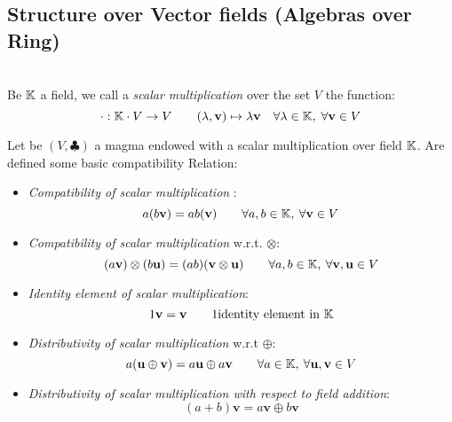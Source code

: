 \documentclass[a4paper,12pt]{scrartcl}    %
\newcommand{\OpA}{\otimes}
\newcommand{\OpB}{\oplus}
\begin{document}
\begin{landscape}
\newpage
	\begin{minipage}[c][\textheight]{0.30 \linewidth}
	    \section*{Structure over Vector fields (Algebras over Ring)}
	    \mbox{}\\
			Be $\mathbb{K}$ a field, we call a \emph{scalar multiplication} over the set $V$ the function:
				\begin{displaymath}
					\cdot : \mathbb{K} \cdot V \rightarrow  V \qquad (\lambda, \mathbf{v}) \mapsto \lambda \mathbf{v} \quad \forall \lambda \in \mathbb{K},\; 
					\forall \mathbf{v} \in V
				\end{displaymath}
			
			Let be $(V, \clubsuit)$ a magma endowed with a scalar multiplication over field $\mathbb{K}$.
			Are defined some basic compatibility  Relation:
			\begin{itemize}
			\item \emph{Compatibility of scalar multiplication} :
				\begin{equation}\label{scalarmulti}
					a ( b \mathbf{v} ) = ab (\mathbf{v}) \qquad \forall a,b \in \mathbb{K},\: \forall \mathbf{v} \in V
				\end{equation}
			\item \emph{Compatibility of scalar multiplication} w.r.t. $\OpA$:
				\begin{equation}\label{scalarcompat}
					 (a \mathbf{v} ) \OpA (b \mathbf{u)}= (ab) (\mathbf{v}\OpA \mathbf{u}) \qquad 
					 \forall a,b \in \KField,\: \forall \mathbf{v},\mathbf{u} \in V
				\end{equation}
			\item \emph{Identity element of scalar multiplication}:
				\begin{equation}\label{scalaridentity}
					1 \mathbf{v} = \mathbf{v}  \qquad 1 \textrm{identity element in $\mathbb{K}$}
				\end{equation}
			\item \emph{Distributivity of scalar multiplication} w.r.t $\OpB$:
				\begin{equation}\label{scalarDistributivityA}
					a ( \mathbf{u} \OpB \mathbf{v} ) = a \mathbf{u} \OpB a \mathbf{v} \qquad \forall a \in\KField,\: \forall \mathbf{u},\mathbf{v}\in V
				\end{equation}
			\item \emph{Distributivity of scalar multiplication with respect to field addition}:
				\begin{equation}\label{scalarDistributivityB}
					(a +b ) \mathbf{v} = a  \mathbf{v}  \OpB  b \mathbf{v}
				\end{equation}
			\end{itemize}
			

\end{minipage}
\end{landscape}
\end{document}
